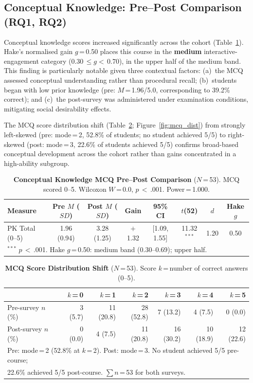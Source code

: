 \documentclass[utf8]{FrontiersinHarvard}
\begin{document}
\subsection{Conceptual Knowledge: Pre--Post Comparison (RQ1, RQ2)}

Conceptual knowledge scores increased significantly across the cohort
(Table~\ref{tab:pk}). Hake's normalised gain $g$\,=\,0.50 places this
course in the \textbf{medium} interactive-engagement category
\citep{hake1998interactive} (0.30\,$\leq g <$\,0.70), in the upper half of
the medium band. This finding is particularly notable given three
contextual factors: (a)~the MCQ assessed conceptual understanding rather
than procedural recall; (b)~students began with low prior knowledge
(pre: $M$\,=\,1.96/5.0, corresponding to 39.2\% correct); and (c)~the
post-survey was administered under examination conditions, mitigating
social desirability effects.

The MCQ score distribution shift (Table~\ref{tab:pk_dist};
Figure~\ref{fig:mcq_dist}) from strongly left-skewed (pre: mode\,=\,2,
52.8\% of students; no student achieved 5/5) to right-skewed (post:
mode\,=\,3, 22.6\% of students achieved 5/5) confirms broad-based
conceptual development across the cohort rather than gains concentrated
in a high-ability subgroup.

\begin{table}[h]
\caption{\textbf{Conceptual Knowledge MCQ Pre--Post Comparison} ($N$\,=\,53).
MCQ scored 0--5. Wilcoxon $W$\,=\,0.0, $p$\,$<$\,.001. Power\,=\,1.000.}
\label{tab:pk}
\begin{tabular}{lccccccc}
\toprule
\textbf{Measure} & \textbf{Pre $M$ ($SD$)} & \textbf{Post $M$ ($SD$)} &
\textbf{Gain} & \textbf{95\% CI} & $t$(52) & $d$ & \textbf{Hake $g$} \\
\midrule
PK Total (0--5) & 1.96 (0.94) & 3.28 (1.25) & $+$1.32 &
[1.09, 1.55] & 11.32$^{***}$ & 1.20 & 0.50 \\
\bottomrule
\multicolumn{8}{l}{\small $^{***}$ $p$\,$<$\,.001. Hake $g$\,=\,0.50: medium band (0.30--0.69); upper half.} \\
\end{tabular}
\end{table}

\begin{table}[h]
\caption{\textbf{MCQ Score Distribution Shift} ($N$\,=\,53). Score
$k$\,=\,number of correct answers (0--5).}
\label{tab:pk_dist}
\begin{tabular}{lrrrrrr}
\toprule
 & $k$\,=\,0 & $k$\,=\,1 & $k$\,=\,2 & $k$\,=\,3 & $k$\,=\,4 & $k$\,=\,5 \\
\midrule
Pre-survey  $n$ (\%) & 3 (5.7)  & 11 (20.8) & 28 (52.8) & 7 (13.2) & 4 (7.5) & 0 (0.0) \\
Post-survey $n$ (\%) & 0 (0.0)  & 4  (7.5)  & 11 (20.8) & 16 (30.2) & 10 (18.9) & 12 (22.6) \\
\bottomrule
\multicolumn{7}{l}{\small Pre: mode\,=\,2 (52.8\% at $k$\,=\,2). Post: mode\,=\,3. No student achieved 5/5 pre-course;} \\
\multicolumn{7}{l}{\small 22.6\% achieved 5/5 post-course. $\sum n$\,=\,53 for both surveys.}
\end{tabular}
\end{table}
\end{document}
